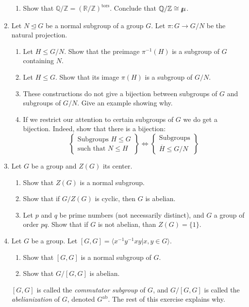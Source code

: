 \documentclass[11pt]{article}
\newcommand{\la}{\langle}
\newcommand{\ra}{\rangle}
\newcommand{\tors}{\mathrm{tors}}
\newcommand{\ab}{\mathrm{ab}}
\newcommand{\bQ}{\mathbb{Q}}
\newcommand{\bR}{\mathbb{R}}
\newcommand{\bZ}{\mathbb{Z}}
\newcommand{\bmu}{\mbox{$\raisebox{-0.59ex}
  {$l$}\hspace{-0.18em}\mu\hspace{-0.88em}\raisebox{-0.98ex}{\scalebox{2}
  {$\color{white}.$}}\hspace{-0.416em}\raisebox{+0.88ex}
  {$\color{white}.$}\hspace{0.46em}$}{}}
\begin{document}
\begin{enumerate}
\begin{enumerate}
    \item Show that $\bQ/\bZ = (\bR/\bZ)^\tors$.  Conclude that $\bQ/\bZ\cong\bmu$.
  \end{enumerate}
  \item Let $N\unlhd G$ be a normal subgroup of a group $G$.  Let $\pi:G\to G/N$ be the natural projection.
  \begin{enumerate}
    \item Let $H\le G/N$.  Show that the preimage $\pi^{-1}(H)$ is a subgroup of $G$ containing $N$.
    \item Let $H\le G$.  Show that its image $\pi(H)$ is a subgroup of $G/N$.
    \item These constructions do not give a bijection between subgroups of $G$ and subgroups of $G/N$.  Give an example showing why.
    \item If we restrict our attention to certain subgroups of $G$ we do get a bijection.  Indeed, show that there is a bijection:
    \[\left\{
    \begin{array}{c}
      \text{Subgroups }H\le G\\
      \text{such that }N\le H
    \end{array}\right\}
    \Longleftrightarrow
    \left\{
    \begin{array}{c}
      \text{Subgroups}\\
      \overline{H}\le G/N
    \end{array}
    \right\}
    \]
  \end{enumerate}
  \item Let $G$ be a group and $Z(G)$ its center.
  \begin{enumerate}
    \item Show that $Z(G)$ is a normal subgroup.
    \item Show that if $G/Z(G)$ is cyclic, then $G$ is abelian.
    \item Let $p$ and $q$ be prime numbers (not necessarily distinct), and $G$ a group of order $pq$.  Show that if $G$ is not abelian, than $Z(G) = \{1\}$.
  \end{enumerate}
  \item Let $G$ be a group.  Let $[G,G] = \la x^{-1}y^{-1}xy | x,y\in G\ra$.
  \begin{enumerate}
    \item Show that $[G,G]$ is a normal subgroup of $G$.
    \item Show that $G/[G,G]$ is abelian.
  \end{enumerate}
  $[G,G]$ is called the \textit{commutator subgroup} of $G$, and $G/[G,G]$ is called the \textit{abelianization} of $G$, denoted $G^\ab$.  The rest of this exercise explains why.

\end{enumerate}
\end{document}
